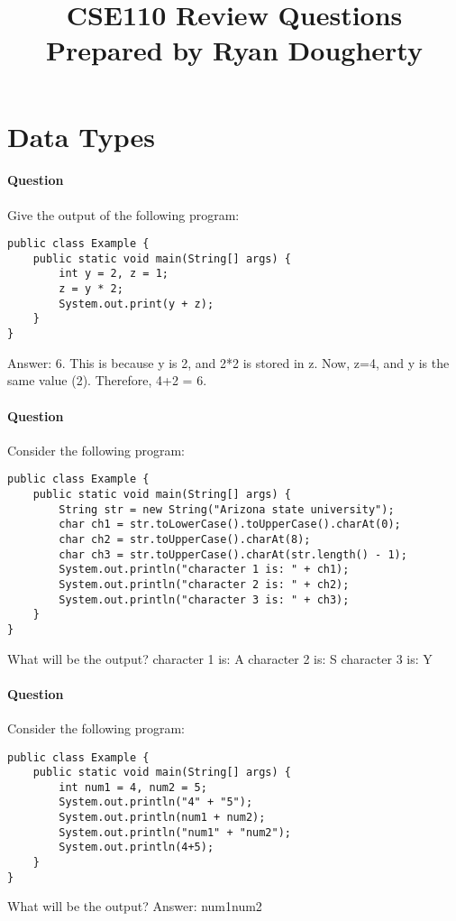 \documentclass{article}
\date{}
\begin{document}
\title{\textbf{CSE110 Review Questions \\
Prepared by Ryan Dougherty}}
\maketitle

\setcounter{question_num}{1}

\section*{Data Types}

\setcounter{question_num}{1}
\paragraph{Question }
Give the output of the following program:
\begin{lstlisting}
public class Example {
	public static void main(String[] args) {
		int y = 2, z = 1;
		z = y * 2;
		System.out.print(y + z);
	}
}
\end{lstlisting}
{\color{red}Answer: 6. This is because y is 2, and 2*2 is stored in z. Now, z=4, and y is the same value (2). Therefore, 4+2 = 6.}

\addtocounter{question_num}{1}
\paragraph{Question }
Consider the following program:
\begin{lstlisting}
public class Example {
	public static void main(String[] args) {
		String str = new String("Arizona state university");
		char ch1 = str.toLowerCase().toUpperCase().charAt(0);
		char ch2 = str.toUpperCase().charAt(8);
		char ch3 = str.toUpperCase().charAt(str.length() - 1);
		System.out.println("character 1 is: " + ch1);
		System.out.println("character 2 is: " + ch2);
		System.out.println("character 3 is: " + ch3);
	}
}
\end{lstlisting}
What will be the output?
\newline
{\color{red}character 1 is: A
\newline character 2 is: S
\newline character 3 is: Y}

\addtocounter{question_num}{1}
\paragraph{Question }
Consider the following program:
\begin{lstlisting}
public class Example {
	public static void main(String[] args) {
		int num1 = 4, num2 = 5;
		System.out.println("4" + "5");
		System.out.println(num1 + num2);
		System.out.println("num1" + "num2");
		System.out.println(4+5);
	}
}
\end{lstlisting}
What will be the output?
\newline
{\color{red}Answer:
\newline num1num2
}
\end{document}

